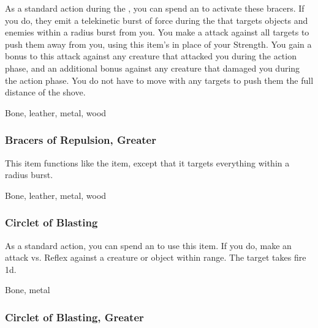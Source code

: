 As a standard action during the , you can spend an  to activate these bracers.
If you do, they emit a telekinetic burst of force during the  that targets objects and enemies within a \areamed radius burst from you.
You make a  attack against all targets to push them away from you, using this item's  in place of your Strength.
You gain a  bonus to this attack against any creature that attacked you during the action phase,
and an additional  bonus against any creature that damaged you during the action phase.
You do not have to move with any targets to push them the full distance of the shove.



 Bone, leather, metal, wood


\lowercase{\hypertarget{item:Bracers of Repulsion, Greater}{}}\label{item:Bracers of Repulsion, Greater}
\hypertarget{item:Bracers of Repulsion, Greater}{\subsubsection{Bracers of Repulsion, Greater\hfill{}}}

This item functions like the  item, except that it targets everything within a \arealarge radius burst.



 Bone, leather, metal, wood


\lowercase{\hypertarget{item:Circlet of Blasting}{}}\label{item:Circlet of Blasting}
\hypertarget{item:Circlet of Blasting}{\subsubsection{Circlet of Blasting\hfill{}}}

As a standard action, you can spend an  to use this item.
If you do, make an attack vs. Reflex against a creature or object within \rngmed range.
\hit The target takes fire  \plus1d.



 


 Bone, metal


\lowercase{\hypertarget{item:Circlet of Blasting, Greater}{}}\label{item:Circlet of Blasting, Greater}
\hypertarget{item:Circlet of Blasting, Greater}{\subsubsection{Circlet of Blasting, Greater\hfill{}}}

